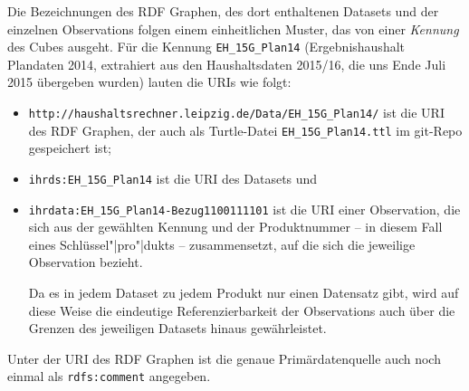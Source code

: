 \documentclass[a4paper,11pt,twoside]{article}
\begin{document}
Die Bezeichnungen des RDF Graphen, des dort enthaltenen Datasets und der
einzelnen Observations folgen einem einheitlichen Muster, das von einer
\emph{Kennung} des Cubes ausgeht.  Für die Kennung \texttt{EH\_15G\_Plan14}
(Ergebnishaushalt Plandaten 2014, extrahiert aus den Haushaltsdaten 2015/16,
die uns Ende Juli 2015 übergeben wurden) lauten die URIs wie folgt:
\begin{itemize}\itemsep0pt
\item \texttt{http://haushaltsrechner.leipzig.de/Data/EH\_15G\_Plan14/} ist die
  URI des RDF Graphen, der auch als Turtle-Datei \texttt{EH\_15G\_Plan14.ttl}
  im git-Repo gespeichert ist;
\item \texttt{ihrds:EH\_15G\_Plan14} ist die URI des Datasets und 
\item \texttt{ihrdata:EH\_15G\_Plan14-Bezug1100111101} ist die URI einer
  Observation, die sich aus der gewählten Kennung und der Produktnummer -- in
  diesem Fall eines Schlüssel"|pro"|dukts -- zusammensetzt, auf die sich die
  jeweilige Observation bezieht.

  Da es in jedem Dataset zu jedem Produkt nur einen Datensatz gibt, wird auf
  diese Weise die eindeutige Referenzierbarkeit der Observations auch über die
  Grenzen des jeweiligen Datasets hinaus gewährleistet.
\end{itemize}
Unter der URI des RDF Graphen ist die genaue Primärdatenquelle auch noch einmal
als \texttt{rdfs:comment} angegeben. 
\end{document}
